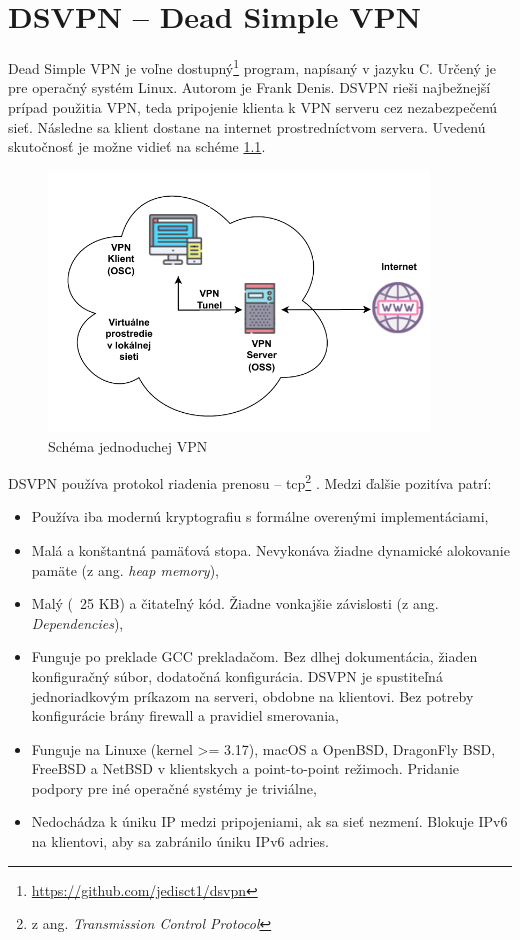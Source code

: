 \chapter{DSVPN -- Dead Simple VPN}\label{dsvpn}
Dead Simple VPN je voľne dostupný\footnote{\href{https://github.com/jedisct1/dsvpn}{https://github.com/jedisct1/dsvpn}} program, napísaný v jazyku C. Určený je pre operačný systém Linux. Autorom je Frank Denis. DSVPN rieši najbežnejší prípad použitia VPN, teda pripojenie klienta k VPN serveru cez nezabezpečenú sieť. Následne sa klient dostane na internet prostredníctvom servera. Uvedenú skutočnosť je možne vidieť na schéme \ref{vpnsimple}.
\begin{figure}
	\centering
	\includegraphics[width=0.9\textwidth]{figures/vpnsimple}
	\caption{Schéma jednoduchej VPN}
	\label{vpnsimple}
\end{figure}


DSVPN používa protokol riadenia prenosu -- \acrshort{tcp}\footnote{z ang. \textit{Transmission Control Protocol}} \cite{tcp}. Medzi ďalšie pozitíva patrí:
\begin{itemize}
	\item{Používa iba modernú kryptografiu s formálne overenými implementáciami,}
	\item{Malá a konštantná pamäťová stopa. Nevykonáva žiadne dynamické alokovanie pamäte (z ang. \textit{heap memory}),}
	\item{Malý (~25 KB) a čitateľný kód. Žiadne vonkajšie závislosti (z ang. \textit{Dependencies}),}
	\item{Funguje po preklade GCC prekladačom. Bez dlhej dokumentácia, žiaden konfiguračný súbor, dodatočná konfigurácia. DSVPN je spustiteľná jednoriadkovým príkazom na serveri, obdobne na klientovi. Bez potreby konfigurácie brány firewall a pravidiel smerovania,}
	\item{Funguje na Linuxe (kernel >= 3.17), macOS a OpenBSD, DragonFly BSD, FreeBSD a NetBSD v klientskych a point-to-point režimoch. Pridanie podpory pre iné operačné systémy je triviálne,}
	\item{Nedochádza k úniku IP medzi pripojeniami, ak sa sieť nezmení. Blokuje IPv6 na klientovi, aby sa zabránilo úniku IPv6 adries.}
\end{itemize} 

